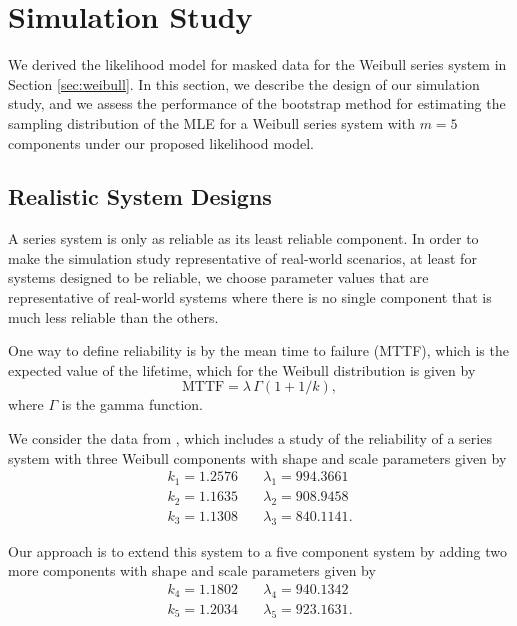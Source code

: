 \documentclass[
]{article}
\begin{document}
\hypertarget{simstudy}{%
\section{Simulation Study}\label{simstudy}}

We derived the likelihood model for masked data for the Weibull series
system in Section \ref{sec:weibull}. In this section, we describe the
design of our simulation study, and we assess the performance of the
bootstrap method for estimating the sampling distribution of the MLE for
a Weibull series system with \(m=5\) components under our proposed
likelihood model.

\hypertarget{sec:reliability}{%
\subsection{Realistic System Designs}\label{sec:reliability}}

A series system is only as reliable as its least reliable component. In
order to make the simulation study representative of real-world
scenarios, at least for systems designed to be reliable, we choose
parameter values that are representative of real-world systems where
there is no single component that is much less reliable than the others.

One way to define reliability is by the mean time to failure (MTTF),
which is the expected value of the lifetime, which for the Weibull
distribution is given by \[
\text{MTTF} = \lambda \, \Gamma(1 + 1/k),
\] where \(\Gamma\) is the gamma function.

We consider the data from \citep{Huairu-2013}, which includes a study of
the reliability of a series system with three Weibull components with
shape and scale parameters given by \begin{equation}
\begin{aligned}
    k_1 = 1.2576 &\quad \lambda_1 = 994.3661\\
    k_2 = 1.1635 &\quad \lambda_2 = 908.9458\\
    k_3 = 1.1308 &\quad \lambda_3 = 840.1141.
\end{aligned}
\end{equation}

Our approach is to extend this system to a five component system by
adding two more components with shape and scale parameters given by
\begin{equation}
\begin{aligned}
    k_4 = 1.1802 &\quad \lambda_4 = 940.1342\\
    k_5 = 1.2034 &\quad \lambda_5 = 923.1631.
\end{aligned}
\end{equation}
\end{document}
